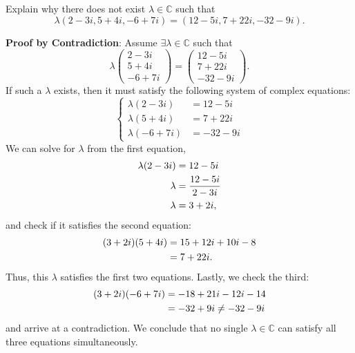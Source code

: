 \documentclass[12pt,letterpaper, onecolumn]{exam}
\begin{document}
\pagebreak

\begin{questions}
    \question
    Explain why there does not exist $\lambda\in\mathbb C$ such that
    $$
    \lambda(2-3i,5+4i,-6+7i)=(12-5i,7+22i,-32-9i).
    $$

    \begin{solution}
        \textbf{Proof by Contradiction}: Assume $\exists\lambda\in\mathbb C$ such that 
        $$
        \lambda\begin{pmatrix}
        2-3i\\5+4i\\-6+7i
        \end{pmatrix}=\begin{pmatrix}
            12-5i\\7+22i\\-32-9i
        \end{pmatrix}.
        $$
        If such a $\lambda$ exists, then it must satisfy the following system of complex equations:
        $$
        \begin{cases}
            \lambda(2-3i) &= 12-5i \\
            \lambda(5+4i) &= 7+22i \\
            \lambda(-6+7i) &= -32-9i
        \end{cases}
        $$
        We can solve for $\lambda$ from the first equation,
        \begin{align}
            \lambda(2-3i) &= 12-5i \notag\\
            \lambda       &= \frac{12-5i}{2-3i}\notag\\
            \lambda       &= 3+2i, \notag
        \end{align}
        and check if it satisfies the second equation:
        \begin{align}
            (3+2i)(5+4i) &= 15+12i+10i-8 \notag\\
                         &= 7+22i.\notag
        \end{align}
        Thus, this $\lambda$ satisfies the first two equations. Lastly, we check the third:
        \begin{align}
            (3+2i)(-6+7i) &= -18+21i-12i-14 \notag\\
                          &= -32+9i\ne -32-9i \notag
        \end{align}
        and arrive at a contradiction. We conclude that no single $\lambda\in\mathbb C$ can satisfy all three equations simultaneously.


\end{solution}
\end{questions}
\end{document}
